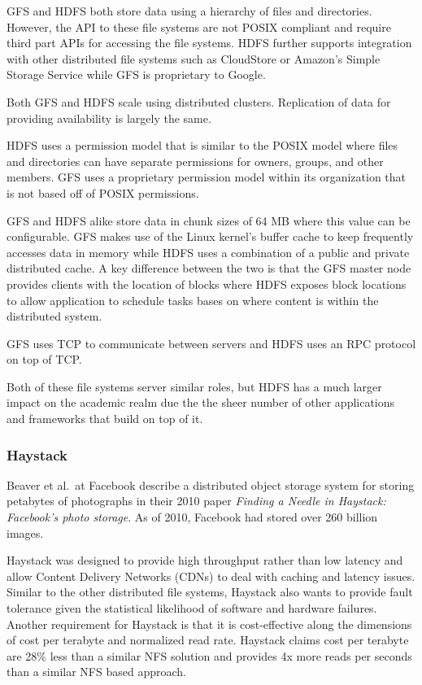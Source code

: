 \documentclass[]{article}
\begin{document}
GFS and HDFS both store data using a hierarchy of files and directories. However, the API to these file systems are not POSIX compliant and require third part APIs for accessing the file systems. HDFS further supports integration with other distributed file systems such as CloudStore or Amazon's Simple Storage Service while GFS is proprietary to Google.

Both GFS and HDFS scale using distributed clusters. Replication of data for providing availability is largely the same.

HDFS uses a permission model that is similar to the POSIX model where files and directories can have separate permissions for owners, groups, and other members. GFS uses a proprietary permission model within its organization that is not based off of POSIX permissions.

GFS and HDFS alike store data in chunk sizes of 64 MB where this value can be configurable. GFS makes use of the Linux kernel's buffer cache to keep frequently accesses data in memory while HDFS uses a combination of a public and private distributed cache. A key difference between the two is that the GFS master node provides clients with the location of blocks where HDFS exposes block locations to allow application to schedule tasks bases on where content is within the distributed system.

GFS uses TCP to communicate between servers and HDFS uses an RPC protocol on top of TCP.

Both of these file systems server similar roles, but HDFS has a much larger impact on the academic realm due the the sheer number of other applications and frameworks that build on top of it.

\subsubsection{Haystack}\label{sssec:haystack}
Beaver et al.\ at Facebook describe a distributed object storage system for storing petabytes of photographs in their 2010 paper \textit{Finding a Needle in Haystack: Facebook's photo storage}\cite{beaver_finding_2010}. As of 2010, Facebook had stored over 260 billion images.

Haystack was designed to provide high throughput rather than low latency and allow Content Delivery Networks (CDNs) to deal with caching and latency issues. Similar to the other distributed file systems, Haystack also wants to provide fault tolerance given the statistical likelihood of software and hardware failures. Another requirement for Haystack is that it is cost-effective along the dimensions of cost per terabyte and normalized read rate. Haystack claims cost per terabyte are 28\% less than a similar NFS solution and provides 4x more reads per seconds than a similar NFS based approach.
\end{document}
